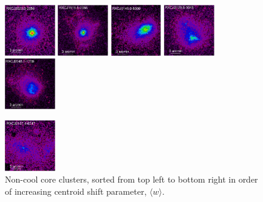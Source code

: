\documentclass[oldversion]{aa}
\begin{document}
\begin{figure}[]
\includegraphics[scale=1.,angle=0,keepaspectratio,width=0.195\textwidth]{0944fa2p.ps}
\hfill
\includegraphics[scale=1.,angle=0,keepaspectratio,width=0.195\textwidth]{0944fa2q.ps}
\hfill
\includegraphics[scale=1.,angle=0,keepaspectratio,width=0.195\textwidth]{0944fa2r.ps}
\hfill
\includegraphics[scale=1.,angle=0,keepaspectratio,width=0.195\textwidth]{0944fa2s.ps}
\hfill
\includegraphics[scale=1.,angle=0,keepaspectratio,width=0.195\textwidth]{0944fa2t.ps}


\includegraphics[scale=1.,angle=0,keepaspectratio,width=0.195\textwidth]{0944fa2u.ps}
\hfill


\caption{{\footnotesize Non-cool core clusters, sorted from top left to bottom right in order of increasing centroid shift parameter, $\langle w \rangle$.}}\label{fig:gallery2}   
\end{figure}
\end{document}
